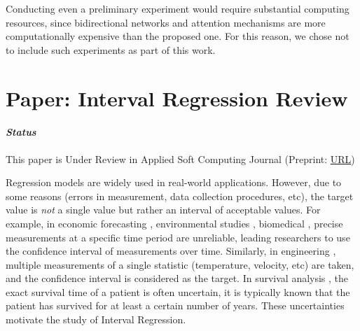 \documentclass[12pt]{article}
\begin{document}
\begin{table}
\begin{tabular}{|lllllllll|}
\end{tabular}
\label{tab:yourlabel}
\end{table}

Conducting even a preliminary experiment would require substantial computing resources, since bidirectional networks and attention mechanisms are more computationally expensive than the proposed one. For this reason, we chose not to include such experiments as part of this work.

\newpage
\section{Paper: Interval Regression Review}
\paragraph{\textit{Status}} This paper is Under Review in Applied Soft Computing Journal (Preprint: \href{https://arxiv.org/abs/2503.02011}{URL})

Regression models are widely used in real-world applications. 
However, due to some reasons (errors in measurement, data collection procedures, etc), the target value is \textit{not} a single value but rather an interval of acceptable values.
For example, in economic forecasting \citep{example_econ}, environmental studies \citep{example_environmental}, biomedical \citep{meRNN}, precise measurements at a specific time period are unreliable, leading researchers to use the confidence interval of measurements over time.
Similarly, in engineering \citep{example_engineering}, multiple measurements of a single statistic (temperature, velocity, etc) are taken, and the confidence interval is considered as the target. 
In survival analysis \citep{example_medical}, the exact survival time of a patient is often uncertain, it is typically known that the patient has survived for at least a certain number of years.
These uncertainties motivate the study of Interval Regression.
\end{document}
